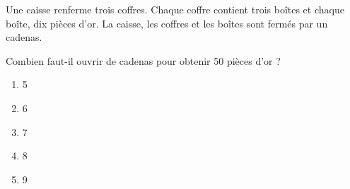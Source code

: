 Une caisse renferme trois coffres. Chaque coffre contient trois boîtes et chaque boîte, dix pièces d'or. La caisse, les coffres et les boîtes sont fermés par un cadenas.\par Combien faut-il ouvrir de cadenas pour obtenir 50 pièces d'or ?
\begin{multicols}{5}
  \begin{enumerate}[A/]
  \item 5
  \item 6
  \item 7
  \item 8
  \item 9
  \end{enumerate}
\end{multicols}